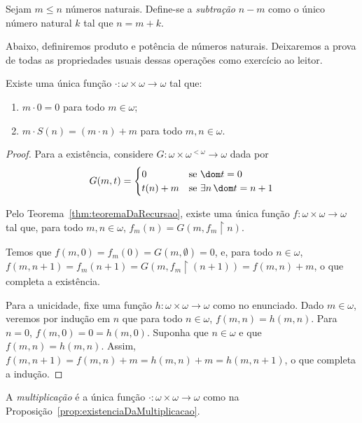 \begin{definition}[$Z^-$]\label{def:subtracaoNosNaturais}
    Sejam $m\leq n$ números naturais.
    Define-se a \emph{subtração} $n-m$ como o único número natural $k$ tal que $n=m+k$.
\end{definition}

Abaixo, definiremos produto e potência de números naturais.
Deixaremos a prova de todas as propriedades usuais dessas operações como exercício ao leitor.

\begin{proposition}[$Z^-$]\label{prop:existenciaDaMultiplicacao}
    Existe uma única função $\cdot: \omega\times \omega\to \omega$ tal que:
    \begin{enumerate}[label=(\roman*)]
        \item $m\cdot 0=0$ para todo $m \in \omega$;
        \item $m\cdot S(n)=(m\cdot n)+m$ para todo $m, n \in \omega$.
    \end{enumerate}
\end{proposition}
\begin{proof}
    Para a existência, considere $G:\omega\times \omega^{<\omega}\to \omega$ dada por
    \[G(m, t)=\begin{cases}
        0 & \text{se } \dom t = 0\\
        t(n)+m & \text{se } \exists n \,\dom t = n+1
    \end{cases}
    \]


    Pelo Teorema~\ref{thm:teoremaDaRecursao}, existe uma única função $f:\omega\times \omega\to \omega$ tal que, para todo $m, n \in \omega$, $f_m(n)=G(m, f_m\restriction n)$.

    Temos que $f(m, 0)=f_m(0)=G(m, \emptyset)=0$, e, para todo $n \in \omega$, $f(m, n+1)=f_m(n+1)=G(m, f_m\restriction (n+1))=f(m, n)+m$, o que completa a existência.

    Para a unicidade, fixe uma função $h:\omega\times \omega\to \omega$ como no enunciado.
    Dado $m \in \omega$, veremos por indução em $n$ que para todo $n \in \omega$, $f(m, n)=h(m, n)$.
    Para $n=0$, $f(m, 0)=0=h(m, 0)$.
    Suponha que $n\in \omega$ e que $f(m, n)=h(m, n)$.
    Assim, $f(m, n+1)=f(m, n)+m=h(m, n)+m=h(m, n+1)$, o que completa a indução.
\end{proof}

\begin{definition}[$Z^-$]\label{def:multiplicacao}
    A \emph{multiplicação} é a única função $\cdot: \omega\times \omega\to \omega$ como na Proposição~\ref{prop:existenciaDaMultiplicacao}.
\end{definition}

